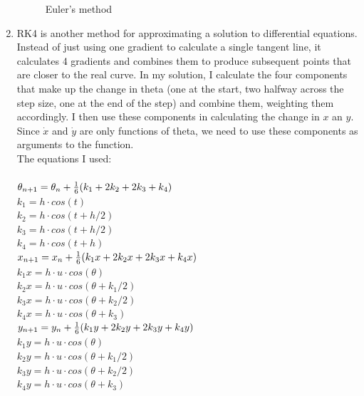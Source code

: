 \documentclass[12pt,a4paper]{article}
\begin{document}
\begin{enumerate}[label=(\alph*)]
\begin{figure}[h!]
	      	\caption{Euler's method}
	      	\label{fig:euler}
	      \end{figure}
	\item RK4 is another method for approximating a solution to differential equations. Instead of just using one gradient to calculate a single tangent line, it calculates 4 gradients and combines them to produce subsequent points that are closer to the real curve. In my solution, I calculate the four components that make up the change in theta (one at the start, two halfway across the step size, one at the end of the step) and combine them, weighting them accordingly. I then use these components in calculating the change in $x$ an $y$. Since $\dot{x}$ and $\dot{y}$ are only functions of theta, we need to use these components as arguments to the function.\\
	The equations I used:\\ \\
		  $ \theta_{n+1} = \theta_n + {1\over{6}} (k_1 + 2k_2 + 2k_3 + k_4) $\\
		$k_1 = h\cdot cos(t)$\\
		$k_2 = h\cdot cos(t+h/2)$\\
		$k_3 = h\cdot cos(t+h/2)$\\
		$k_4 = h\cdot cos(t+h)$\\

		$ x_{n+1} = x_n + {1\over{6}} (k_1x + 2k_2x + 2k_3x + k_4x) $\\
		$k_1x = h \cdot u \cdot cos(\theta)$\\
		$k_2x = h \cdot u \cdot cos(\theta+k_1/2)$\\
		$k_3x = h \cdot u \cdot cos(\theta+k_2/2)$\\
		$k_4x = h \cdot u \cdot cos(\theta+k_3)$\\
		
		$ y_{n+1} = y_n + {1\over{6}} (k_1y + 2k_2y + 2k_3y + k_4y) $\\
		$k_1y = h \cdot u \cdot cos(\theta)$\\
		$k_2y = h \cdot u \cdot cos(\theta+k_1/2)$\\
		$k_3y = h \cdot u \cdot cos(\theta+k_2/2)$\\
		$k_4y = h \cdot u \cdot cos(\theta+k_3)$\\
		

\end{enumerate}
\end{document}
